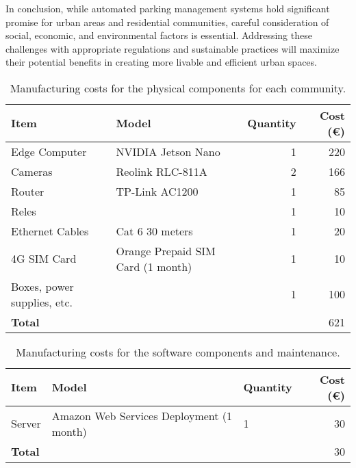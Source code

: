 In conclusion, while automated parking management systems hold significant promise for urban areas and residential communities, careful consideration of social, economic, and environmental factors is essential. Addressing these challenges with appropriate regulations and sustainable practices will maximize their potential benefits in creating more livable and efficient urban spaces.

\begin{table}[H]
	\begin{tabular}{ l l r r }
		\toprule
		\textbf{Item}               & \textbf{Model}                                & \textbf{Quantity} & \textbf{Cost (\euro)} \\
		\midrule
		Edge Computer               & NVIDIA Jetson Nano \autocite{reComputerJ1010} & 1                 & 220                   \\
		Cameras                     & Reolink RLC-811A \autocite{ReolinkRLC811A}    & 2                 & 166                   \\
		Router                      & TP-Link AC1200 \autocite{TPLinkArcherMR600}   & 1                 & 85                    \\
		Reles                       &                                               & 1                 & 10                    \\
		Ethernet Cables             & Cat 6 30 meters                               & 1                 & 20                    \\
		4G SIM Card                 & Orange Prepaid SIM Card (1 month)             & 1                 & 10                    \\
		Boxes, power supplies, etc. &                                               & 1                 & 100                   \\
		\midrule
		\textbf{Total}              &                                               &                   & 621                   \\
		\bottomrule
	\end{tabular}
	\caption{Manufacturing costs for the physical components for each community.}\label{tab:manufacturing_costs_physical_components}
\end{table}

\begin{table}[H]
	\begin{tabular}{ l l l r }
		\toprule
		\textbf{Item}  & \textbf{Model}                           & \textbf{Quantity} & \textbf{Cost (\euro)} \\
		\midrule
		Server         & Amazon Web Services Deployment (1 month) & 1                 & 30                    \\
		\midrule
		\textbf{Total} &                                          &                   & 30                    \\
		\bottomrule
	\end{tabular}
	\caption{Manufacturing costs for the software components and maintenance.}\label{tab:manufacturing_costs_software_components}
\end{table}
